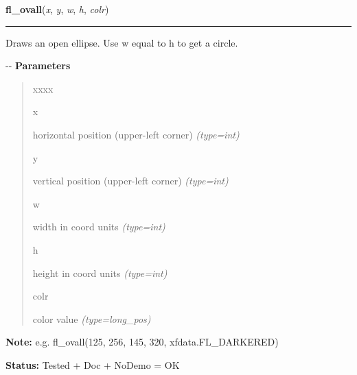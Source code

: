     \vspace{0.5ex}

\hspace{.8\funcindent}\begin{boxedminipage}{\funcwidth}

    \raggedright \textbf{fl\_ovall}(\textit{x}, \textit{y}, \textit{w}, \textit{h}, \textit{colr})

    \vspace{-1.5ex}

    \rule{\textwidth}{0.5\fboxrule}
\setlength{\parskip}{2ex}

Draws an open ellipse. Use w equal to h to get a circle.

-{}-
\setlength{\parskip}{1ex}
      \textbf{Parameters}
      \vspace{-1ex}

      \begin{quote}
        \begin{Ventry}{xxxx}

          \item[x]


horizontal position (upper-left corner)
            {\it (type=int)}

          \item[y]


vertical position (upper-left corner)
            {\it (type=int)}

          \item[w]


width in coord units
            {\it (type=int)}

          \item[h]


height in coord units
            {\it (type=int)}

          \item[colr]


color value
            {\it (type=long\_pos)}

        \end{Ventry}

      \end{quote}

\textbf{Note:} 
e.g. fl\_ovall(125, 256, 145, 320, xfdata.FL\_DARKERED)


\textbf{Status:} 
Tested + Doc + NoDemo = OK


    \end{boxedminipage}

    \label{xformslib:flxbasic:fl_ovalbound}

